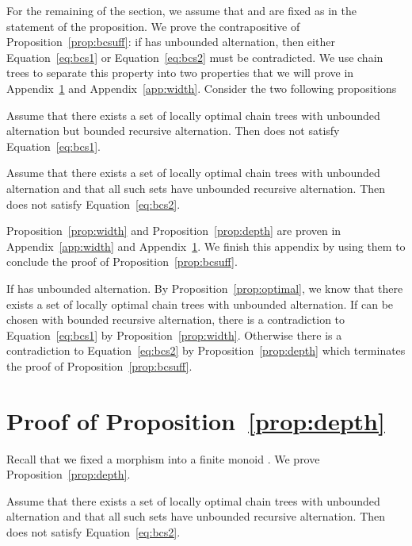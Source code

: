 \documentclass[envcountsame]{llncs}
\newcounter{sauvegarde}
\newcommand\adjustc[1]{\protect{\setcounter{sauvegarde}{\thetheorem}
  \setcounterref{theorem}{#1}
  \addtocounter{theorem}{-1}
}}
\newcommand\restorec{
\setcounter{theorem}{\thesauvegarde}
}
\newcommand\chain{chain\xspace}
\begin{document}
For the remaining of the section, we assume that  and 
are fixed as in the statement of the proposition. We prove the
contrapositive of Proposition~\ref{prop:bcsuff}: if 
has unbounded alternation, then either Equation~\eqref{eq:bcs1} or
Equation~\eqref{eq:bcs2} must be contradicted. We use \chain trees to
separate this property into two properties that we will prove in
Appendix~\ref{app:depth} and Appendix~\ref{app:width}. Consider the
two following propositions 

\begin{proposition} \label{prop:width}
  Assume that there exists a set of locally optimal \chain trees  with unbounded alternation but bounded
  recursive alternation. Then  does not satisfy
  Equation~\eqref{eq:bcs1}.
\end{proposition}

\begin{proposition} \label{prop:depth}
  Assume that there exists a set of locally optimal \chain
  trees  with unbounded alternation and that
  all such sets have unbounded recursive alternation. Then  does
  not satisfy Equation~\eqref{eq:bcs2}.
\end{proposition}

Proposition~\ref{prop:width} and Proposition~\ref{prop:depth} are
proven in Appendix~\ref{app:width} and Appendix~\ref{app:depth}. We
finish this appendix by using them to conclude the proof of
Proposition~\ref{prop:bcsuff}.

If  has unbounded alternation. By
Proposition~\ref{prop:optimal}, we know that there exists a set of
locally optimal \chain trees  with
unbounded alternation. If  can be chosen with bounded recursive
alternation, there is a contradiction to Equation~\eqref{eq:bcs1} by
Proposition~\ref{prop:width}. Otherwise there is a contradiction to
Equation~\eqref{eq:bcs2} by Proposition~\ref{prop:depth} which
terminates the proof of Proposition~\ref{prop:bcsuff}.


\section{Proof of Proposition~\ref{prop:depth}}
\label{app:depth}
Recall that we fixed a morphism  into a
finite monoid . We prove Proposition~\ref{prop:depth}.

\adjustc{prop:depth}
\begin{proposition}
  Assume that there exists a set of locally optimal \chain
  trees  with unbounded alternation and that
  all such sets have unbounded recursive alternation. Then  does
  not satisfy Equation~\eqref{eq:bcs2}.
\end{proposition}
\restorec
\end{document}

